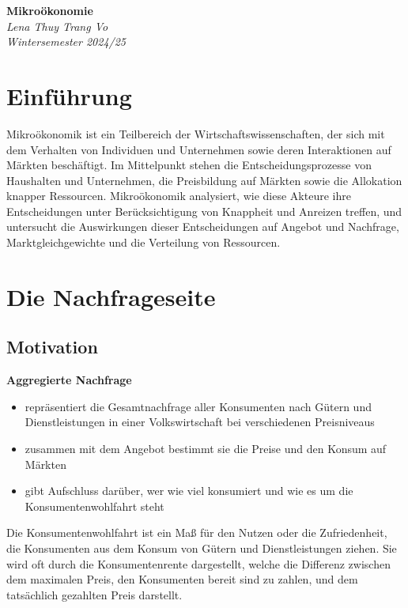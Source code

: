 \documentclass[a4paper, 10pt]{article}
\begin{document}
\begin{titlepage}
    \centering
    \vspace*{3cm}
    {\Huge \textbf{Mikroökonomie}}\\[1.5cm]
    {\large \textit{Lena Thuy Trang Vo}}\\[0.5cm]
    {\large \textit{Wintersemester 2024/25}}\\[2cm]

    \vfill
\end{titlepage}

\tableofcontents
\newpage

\section{Einführung}
Mikroökonomik ist ein Teilbereich der Wirtschaftswissenschaften, der sich mit dem Verhalten von Individuen und Unternehmen sowie deren Interaktionen auf Märkten beschäftigt. Im Mittelpunkt stehen die Entscheidungsprozesse von Haushalten und Unternehmen, die Preisbildung auf Märkten sowie die Allokation knapper Ressourcen. Mikroökonomik analysiert, wie diese Akteure ihre Entscheidungen unter Berücksichtigung von Knappheit und Anreizen treffen, und untersucht die Auswirkungen dieser Entscheidungen auf Angebot und Nachfrage, Marktgleichgewichte und die Verteilung von Ressourcen.


\section{Die Nachfrageseite}
\subsection{Motivation}

\textbf{Aggregierte Nachfrage}
\begin{itemize}
    \item repräsentiert die Gesamtnachfrage aller Konsumenten nach Gütern und Dienstleistungen in einer Volkswirtschaft bei verschiedenen Preisniveaus
    \item zusammen mit dem Angebot bestimmt sie die Preise und den Konsum auf Märkten
    \item gibt Aufschluss darüber, wer wie viel konsumiert und wie es um die Konsumentenwohlfahrt steht
\end{itemize}

\begin{definitionbox}
    Die Konsumentenwohlfahrt ist ein Maß für den Nutzen oder die Zufriedenheit, die Konsumenten aus dem Konsum von Gütern und Dienstleistungen ziehen. Sie wird oft durch die Konsumentenrente dargestellt, welche die Differenz zwischen dem maximalen Preis, den Konsumenten bereit sind zu zahlen, und dem tatsächlich gezahlten Preis darstellt.
\end{definitionbox}
\end{document}
